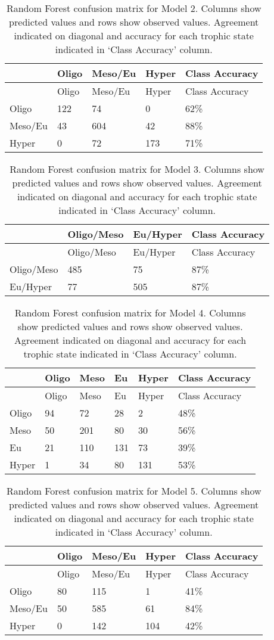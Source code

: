 \documentclass[11pt,]{article}
\begin{document}
\newpage

\begin{longtable}[c]{@{}lllll@{}}
\caption{Random Forest confusion matrix for Model 2. Columns show
predicted values and rows show observed values. Agreement indicated on
diagonal and accuracy for each trophic state indicated in `Class
Accuracy' column. \label{tab:Confusion_Model2}}\tabularnewline
\toprule
& Oligo & Meso/Eu & Hyper & Class Accuracy\tabularnewline
\midrule
\endfirsthead
\toprule
& Oligo & Meso/Eu & Hyper & Class Accuracy\tabularnewline
\midrule
\endhead
Oligo & 122 & 74 & 0 & 62\%\tabularnewline
Meso/Eu & 43 & 604 & 42 & 88\%\tabularnewline
Hyper & 0 & 72 & 173 & 71\%\tabularnewline
\bottomrule
\end{longtable}

\newpage

\begin{longtable}[c]{@{}llll@{}}
\caption{Random Forest confusion matrix for Model 3. Columns show
predicted values and rows show observed values. Agreement indicated on
diagonal and accuracy for each trophic state indicated in `Class
Accuracy' column. \label{tab:Confusion_Model3}}\tabularnewline
\toprule
& Oligo/Meso & Eu/Hyper & Class Accuracy\tabularnewline
\midrule
\endfirsthead
\toprule
& Oligo/Meso & Eu/Hyper & Class Accuracy\tabularnewline
\midrule
\endhead
Oligo/Meso & 485 & 75 & 87\%\tabularnewline
Eu/Hyper & 77 & 505 & 87\%\tabularnewline
\bottomrule
\end{longtable}

\newpage

\begin{longtable}[c]{@{}llllll@{}}
\caption{Random Forest confusion matrix for Model 4. Columns show
predicted values and rows show observed values. Agreement indicated on
diagonal and accuracy for each trophic state indicated in `Class
Accuracy' column. \label{tab:Confusion_Model4}}\tabularnewline
\toprule
& Oligo & Meso & Eu & Hyper & Class Accuracy\tabularnewline
\midrule
\endfirsthead
\toprule
& Oligo & Meso & Eu & Hyper & Class Accuracy\tabularnewline
\midrule
\endhead
Oligo & 94 & 72 & 28 & 2 & 48\%\tabularnewline
Meso & 50 & 201 & 80 & 30 & 56\%\tabularnewline
Eu & 21 & 110 & 131 & 73 & 39\%\tabularnewline
Hyper & 1 & 34 & 80 & 131 & 53\%\tabularnewline
\bottomrule
\end{longtable}

\newpage

\begin{longtable}[c]{@{}lllll@{}}
\caption{Random Forest confusion matrix for Model 5. Columns show
predicted values and rows show observed values. Agreement indicated on
diagonal and accuracy for each trophic state indicated in `Class
Accuracy' column. \label{tab:Confusion_Model5}}\tabularnewline
\toprule
& Oligo & Meso/Eu & Hyper & Class Accuracy\tabularnewline
\midrule
\endfirsthead
\toprule
& Oligo & Meso/Eu & Hyper & Class Accuracy\tabularnewline
\midrule
\endhead
Oligo & 80 & 115 & 1 & 41\%\tabularnewline
Meso/Eu & 50 & 585 & 61 & 84\%\tabularnewline
Hyper & 0 & 142 & 104 & 42\%\tabularnewline
\bottomrule
\end{longtable}
\end{document}
